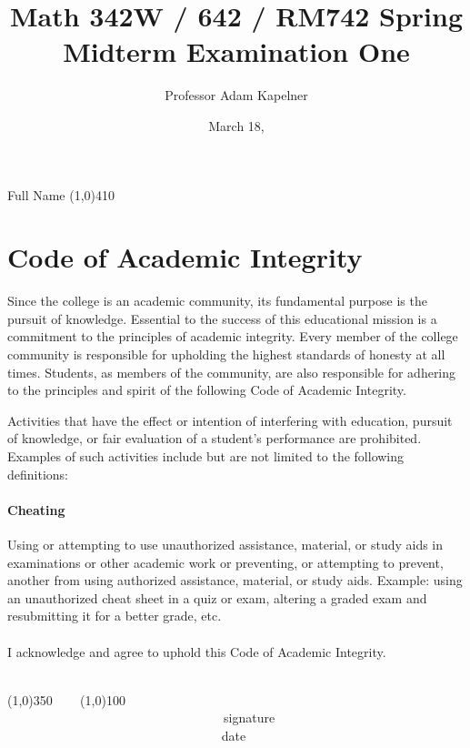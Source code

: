 \documentclass[12pt]{article}
\title{Math 342W / 642 / RM742 Spring \the\year{} \\ Midterm Examination One}
\author{Professor Adam Kapelner}
\date{March 18, \the\year{}}
\begin{document}
\maketitle

\noindent Full Name \line(1,0){410}

\thispagestyle{empty}

\section*{Code of Academic Integrity}

\footnotesize
Since the college is an academic community, its fundamental purpose is the pursuit of knowledge. Essential to the success of this educational mission is a commitment to the principles of academic integrity. Every member of the college community is responsible for upholding the highest standards of honesty at all times. Students, as members of the community, are also responsible for adhering to the principles and spirit of the following Code of Academic Integrity.

Activities that have the effect or intention of interfering with education, pursuit of knowledge, or fair evaluation of a student's performance are prohibited. Examples of such activities include but are not limited to the following definitions:

\paragraph{Cheating} Using or attempting to use unauthorized assistance, material, or study aids in examinations or other academic work or preventing, or attempting to prevent, another from using authorized assistance, material, or study aids. Example: using an unauthorized cheat sheet in a quiz or exam, altering a graded exam and resubmitting it for a better grade, etc.\\
\\
\noindent I acknowledge and agree to uphold this Code of Academic Integrity. \\~\\

\begin{center}
\line(1,0){350} ~~~ \line(1,0){100}\\
~~~~~~~~~~~~~~~~~~~~~~~~~~~~~~~~~~signature~~~~~~~~~~~~~~~~~~~~~~~~~~~~~~~~~~~~~~~~~~~~~~~~~~~~~~~~~~~~~~ date
\end{center}

\normalsize
\end{document}
